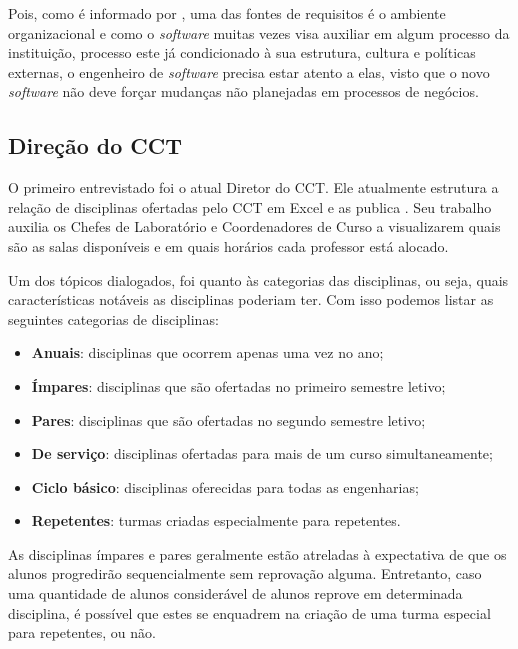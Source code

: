 Pois, como é informado por , uma das fontes de requisitos é o ambiente organizacional e como o \textit{software} muitas vezes visa auxiliar em algum processo da instituição, processo este já condicionado à sua estrutura, cultura e políticas externas, o engenheiro de \textit{software} precisa estar atento a elas, visto que o novo \textit{software} não deve forçar mudanças não planejadas em processos de negócios.

\subsection{Direção do CCT} \label{ssec:3_Diretor} %

O primeiro entrevistado foi o atual Diretor do CCT. Ele atualmente estrutura a relação de disciplinas ofertadas pelo CCT em Excel e as publica . Seu trabalho auxilia os Chefes de Laboratório e Coordenadores de Curso a visualizarem quais são as salas disponíveis e em quais horários cada professor está alocado.

Um dos tópicos dialogados, foi quanto às categorias das disciplinas, ou seja, quais características notáveis as disciplinas poderiam ter. Com isso podemos listar as seguintes categorias de disciplinas:

\begin{itemize}
  \item \textbf{Anuais}: disciplinas que ocorrem apenas uma vez no ano;
  \item \textbf{Ímpares}: disciplinas que são ofertadas no primeiro semestre letivo;
  \item \textbf{Pares}: disciplinas que são ofertadas no segundo semestre letivo;
  \item \textbf{De serviço}: disciplinas ofertadas para mais de um curso simultaneamente;
  \item \textbf{Ciclo básico}: disciplinas oferecidas para todas as engenharias;
  \item \textbf{Repetentes}: turmas criadas especialmente para repetentes.
\end{itemize}

As disciplinas ímpares e pares geralmente estão atreladas à expectativa de que os alunos progredirão sequencialmente sem reprovação alguma. Entretanto, caso uma quantidade de alunos considerável de alunos reprove em determinada disciplina, é possível que estes se enquadrem na criação de uma turma especial para repetentes, ou não.

